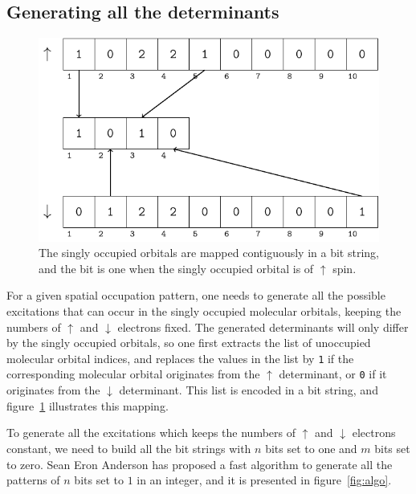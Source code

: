 \documentclass[aip,jcp,reprint,showkeys]{revtex4-1}
\newcommand{\up}{\uparrow}
\newcommand{\dn}{\downarrow}
\newcommand{\sop}{spatial occupation pattern}
\begin{document}
\subsection{Generating all the determinants}

\begin{figure}
\includegraphics[width=0.9\columnwidth]{mapping}
\caption{The singly occupied orbitals are mapped contiguously in a bit string,
and the bit is one when the singly occupied orbital is of $\up$ spin.}
\label{fig:mapping}
\end{figure}





For a given {\sop}, one needs to generate all the possible excitations that can
occur in the singly occupied molecular orbitals, keeping the numbers of $\up$
and $\dn$ electrons fixed. The generated determinants will only differ by the
singly occupied orbitals, so one first extracts the list of unoccupied molecular
orbital indices, and replaces the values in the list by 
\texttt{1} if the corresponding molecular orbital originates from the $\up$
determinant, or \texttt{0} if it originates from the $\dn$ determinant. 
This list is encoded in a bit string, and figure~\ref{fig:mapping} illustrates
this mapping.

To generate all the excitations which keeps the numbers of $\up$ and $\dn$
electrons constant, we need to build all the bit strings with $n$
bits set to one and $m$ bits set to zero.
Sean Eron Anderson\cite{NextBit} has proposed a fast algorithm to generate all
the patterns of $n$ bits set to $1$ in an integer, and it is presented in
figure~\ref{fig:algo}.
\end{document}
